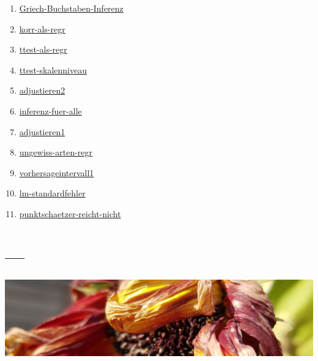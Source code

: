 \documentclass[
  a4paper,
  DIV=11]{scrreprt}
\providecommand{\tightlist}{%
  \setlength{\itemsep}{0pt}\setlength{\parskip}{0pt}}\usepackage{longtable,booktabs,array}
\theoremstyle{definition}
\theoremstyle{remark}
\begin{document}
\begin{enumerate}
\def\labelenumi{\arabic{enumi}.}
\tightlist
\item
  \href{https://datenwerk.netlify.app/posts/griech-buchstaben-inferenz/griech-buchstaben-inferenz/}{Griech-Buchstaben-Inferenz}
\item
  \href{https://datenwerk.netlify.app/posts/korr-als-regr/korr-als-regr/}{korr-als-regr}
\item
  \href{https://datenwerk.netlify.app/posts/ttest-als-regr/ttest-als-regr/}{ttest-als-regr}
\item
  \href{https://datenwerk.netlify.app/posts/ttest-skalenniveau/ttest-skalenniveau/}{ttest-skalenniveau}
\item
  \href{https://datenwerk.netlify.app/posts/adjustieren2/adjustieren2/}{adjustieren2}
\item
  \href{https://datenwerk.netlify.app/posts/inferenz-fuer-alle/inferenz-fuer-alle}{inferenz-fuer-alle}
\item
  \href{https://datenwerk.netlify.app/posts/adjustieren1/adjustieren1.html}{adjustieren1}
\item
  \href{https://datenwerk.netlify.app/posts/ungewiss-arten-regr/ungewiss-arten-regr.html}{ungewiss-arten-regr}
\item
  \href{https://datenwerk.netlify.app/posts/vorhersageintervall1/vorhersageintervall1.html}{vorhersageintervall1}
\item
  \href{https://datenwerk.netlify.app/posts/lm-standardfehler/lm-standardfehler}{lm-standardfehler}
\item
  \href{https://datenwerk.netlify.app/posts/punktschaetzer-reicht-nicht/punktschaetzer-reicht-nicht.html}{punktschaetzer-reicht-nicht}
\end{enumerate}

\hypertarget{section-1}{%
\section{---}\label{section-1}}

\includegraphics[width=1\textwidth,height=\textheight]{./img/outro-02.jpg}

\end{document}
